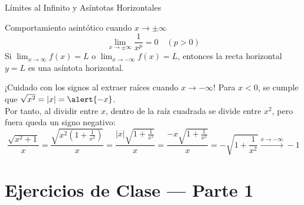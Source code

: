 \documentclass[aspectratio=169]{beamer}
\begin{document}
\begin{frame}{Límites al Infinito y Asíntotas Horizontales}
  \begin{block}{Comportamiento asintótico cuando $x \to \pm\infty$}
    $$\lim_{x \to \pm\infty} \frac{1}{x^p} = 0 \quad (p > 0)$$
    Si $\lim_{x \to \infty} f(x) = L$ o $\lim_{x \to -\infty} f(x) = L$, entonces la recta horizontal \textbf{$y = L$} es una asíntota horizontal.
  \end{block}

  \vspace{4pt}
  \begin{alertblock}{¡Cuidado con los signos al extraer raíces cuando $x \to -\infty$!}
    Para $x < 0$, se cumple que $\sqrt{x^2} = |x| = \alert{-x}$. \\
    Por tanto, al dividir entre $x$, dentro de la raíz cuadrada se divide entre $x^2$, pero fuera queda un signo negativo:
    $$\frac{\sqrt{x^2 + 1}}{x} = \frac{\sqrt{x^2(1 + \frac{1}{x^2})}}{x} = \frac{|x|\sqrt{1 + \frac{1}{x^2}}}{x} = \frac{-x\sqrt{1 + \frac{1}{x^2}}}{x} = -\sqrt{1 + \frac{1}{x^2}} \xrightarrow{x \to -\infty} -1$$
  \end{alertblock}
\end{frame}



\section{Ejercicios de Clase — Parte 1}
\end{document}
